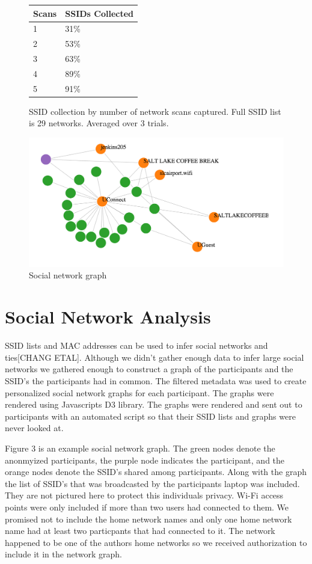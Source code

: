 \documentclass[letterpaper,twocolumn,10pt]{article}
\begin{document}
\begin{figure}
\centering
\begin{tabular}{l | l}
Scans & SSIDs Collected \\ 
\hline
1 & 31\% \\
2 & 53\% \\
3 & 63\% \\
4 & 89\% \\
5 & 91\% \\
\end{tabular}
\caption{SSID collection by number of network scans captured. Full SSID list is 29 networks. Averaged over 3 trials.}
\end{figure}
\begin{figure}
\centering
\includegraphics[scale=.5]{graph.png}
\caption{\textsf{Social network graph}}
\end{figure}

\section{Social Network Analysis}
SSID lists and MAC addresses can be used to infer social networks and ties[CHANG ETAL]. Although we didn't gather enough data to infer large social networks we gathered enough to construct a graph of the participants and the SSID's the participants had in common. The filtered metadata was used to create personalized social network graphs for each participant. The graphs were rendered using Javascripts D3 library. The graphs were rendered and sent out to participants with an automated script so that their SSID lists and graphs were never looked at. 

Figure 3 is an example social network graph. The green nodes denote the anonmyized participants, the purple node indicates the participant, and the orange nodes denote the SSID's shared among participants. Along with the graph the list of SSID's that was broadcasted by the participants laptop was included. They are not pictured here to protect this individuals privacy. Wi-Fi access points were only included if more than two users had connected to them. We promised not to include the home network names and only one home network name had at least two particpants that had connected to it. The network happened to be one of the authors home networks so we received authorization to include it in the network graph. 
\end{document}
